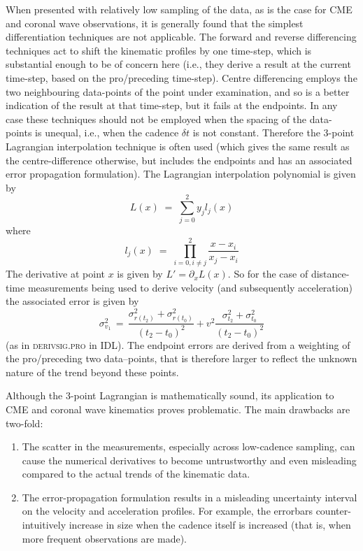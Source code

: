\documentclass[structabstract]{aa}
\begin{document}
When presented with relatively low sampling of the data, as is the case for CME and coronal wave observations, it is generally found that the simplest differentiation techniques are not applicable. The forward and reverse differencing techniques act to shift the kinematic profiles by one time-step, which is substantial enough to be of concern here (i.e., they derive a result at the current time-step, based on the pro/preceding time-step). Centre differencing employs the two neighbouring data-points of the point under examination, and so is a better indication of the result at that time-step, but it fails at the endpoints. In any case these techniques should not be employed when the spacing of the data-points is unequal, i.e., when the cadence $\delta t$ is not constant. Therefore the 3-point Lagrangian interpolation technique is often used (which gives the same result as the centre-difference otherwise, but includes the endpoints and has an associated error propagation formulation). The Lagrangian interpolation polynomial is given by
\begin{equation}
L(x) \; =\; \sum_{j=0}^2 y_j l_j(x) 
\end{equation}
where
\begin{equation}
l_j(x) \; =\; \prod_{i=0, i\neq j}^2 \frac{x-x_i}{x_j-x_i} 
\end{equation}
The derivative at point $x$ is given by $L'=\partial_x L(x)$. So for the case of distance-time measurements being used to derive velocity (and subsequently acceleration) the associated error is given by
\begin{equation}
\sigma_{v_1}^2 \,=\, \frac{\sigma_{r(t_2)}^2+\sigma_{r(t_0)}^2}{(t_2-t_0)^2} + v^2 \frac{\sigma_{t_2}^2+\sigma_{t_0}^2}{(t_2-t_0)^2}
\label{vel_err}
\end{equation}
(as in \textsc{derivsig.pro} in IDL). The endpoint errors are derived from a weighting of the pro/preceding two data--points, that is therefore larger to reflect the unknown nature of the trend beyond these points.

Although the 3-point Lagrangian is mathematically sound, its application to CME and coronal wave kinematics proves problematic. The main drawbacks are two-fold:
\begin{enumerate}
\item The scatter in the measurements, especially across low-cadence sampling, can cause the numerical derivatives to become untrustworthy and even misleading compared to the actual trends of the kinematic data.
\item The error-propagation formulation results in a misleading uncertainty interval on the velocity and acceleration profiles. For example, the errorbars counter-intuitively increase in size when the cadence itself is increased (that is, when more frequent observations are made).
\end{enumerate}
\end{document}
